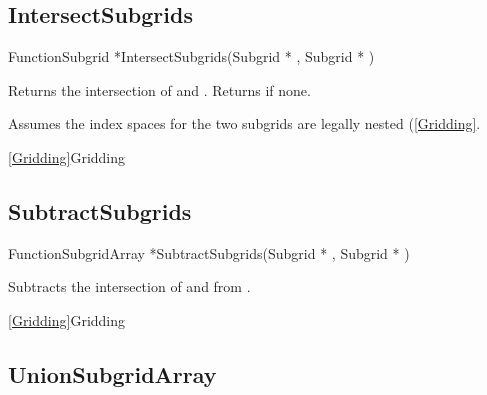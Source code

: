 \newpage
\subsection{IntersectSubgrids}
\label{IntersectSubgrids}


\begin{deftypefn}{Function}{Subgrid *}{IntersectSubgrids}({Subgrid *} , {Subgrid *} )

\DESCRIPTION
Returns the intersection of  and .
Returns  if none.

\NOTES
Assumes the index spaces for the two subgrids are legally nested
(\ref{Gridding}.

\SEEALSO
\vref{Gridding}{Gridding}

\end{deftypefn}


\newpage
\subsection{SubtractSubgrids}
\label{SubtractSubgrids}


\begin{deftypefn}{Function}{SubgridArray *}{SubtractSubgrids}({Subgrid *} , {Subgrid *} )

\DESCRIPTION
Subtracts the intersection of  and 
from .

\SEEALSO
\vref{Gridding}{Gridding}

\end{deftypefn}


\newpage
\subsection{UnionSubgridArray}
\label{UnionSubgridArray}


